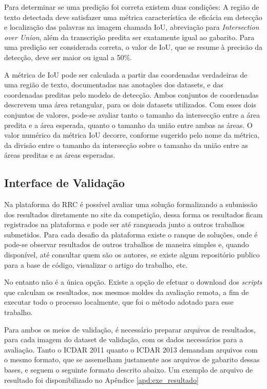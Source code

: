 Para determinar se uma predição foi correta existem duas condições: A região de texto detectada deve satisfazer uma métrica característica de eficácia em detecção e localização das palavras na imagem chamada IoU, abreviação para \textit{Intersection over Union}, além da transcrição predita ser exatamente igual ao gabarito. Para uma predição ser considerada correta, o valor de IoU, que se resume à precisão da detecção, deve ser maior ou igual a 50\%.

A métrica de IoU pode ser calculada a partir das coordenadas verdadeiras de uma região de texto, documentadas nas anotações dos datasets, e das coordenadas preditas pelo modelo de detecção. Ambos conjuntos de coordenadas descrevem uma área retangular, para os dois datasets utilizados. Com esses dois conjuntos de valores, pode-se avaliar tanto o tamanho da intersecção entre a área predita e a área esperada, quanto o tamanho da união entre ambas as áreas. O valor numérico da métrica IoU decorre, conforme sugerido pelo nome da métrica, da divisão entre o tamanho da intersecção sobre o tamanho da união entre as áreas preditas e as áreas esperadas.

\subsection{Interface de Validação}\label{sec:methodology_validation_interface}
Na plataforma do RRC é possível avaliar uma solução formalizando a submissão dos resultados diretamente no site da competição, dessa forma os resultados ficam registrados na plataforma e pode ser até ranqueada junto a outros trabalhos submetidos. Para cada desafio da plataforma existe o ranque de soluções, onde é pode-se observar resultados de outros trabalhos de maneira simples e, quando disponível, até consultar quem são os autores, se existe algum repositório publico para a base de código, visualizar o artigo do trabalho, etc.

No entanto não é a única opção. Existe a opção de efetuar o download dos \textit{scripts} que calculam os resultados, nos mesmos moldes da avaliação remota, a fim de executar todo o processo localmente, que foi o método adotado para esse trabalho.

Para ambos os meios de validação, é necessário preparar arquivos de resultados, para cada imagem do dataset de validação, com os dados necessários para a avaliação. Tanto o ICDAR 2011 quanto o ICDAR 2013 demandam arquivos com o mesmo formato, que se assemelham justamente aos arquivos de gabarito dessas bases, e seguem o seguinte formato descrito abaixo. Um exemplo de arquivo de resultado foi disponibilizado no Apêndice \ref{apd:exe_resultado}

